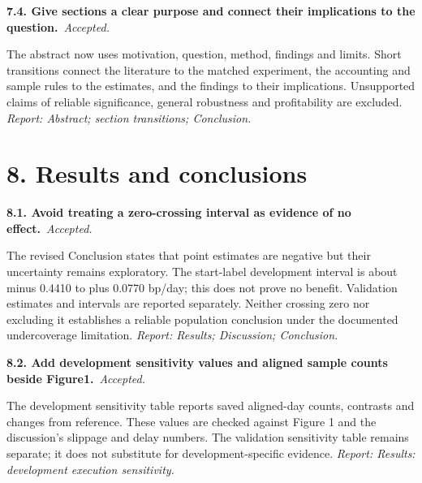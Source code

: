 \documentclass[11pt,a4paper]{article}
\newcommand{\Needspace}[1]{\par\begingroup\ifdim\dimexpr\pagegoal-\pagetotal\relax<#1\relax\newpage\fi\endgroup}
\newcommand{\reply}[3]{\par\addvspace{5pt}\noindent\textbf{#1. #2}\ \textit{#3.}\par\nobreak}
\begin{document}
\par\noindent\begin{minipage}{\linewidth}\justifying
\reply{7.4}{Give sections a clear purpose and connect their implications to the question.}{Accepted}
The abstract now uses motivation, question, method, findings and limits. Short transitions connect the literature to the matched experiment, the accounting and sample rules to the estimates, and the findings to their implications. Unsupported claims of reliable significance, general robustness and profitability are excluded.
{\small\textit{Report: Abstract; section transitions; Conclusion.}}
\end{minipage}\par\addvspace{5pt}

\Needspace{10\baselineskip}
\section*{8. Results and conclusions}
\par\noindent\begin{minipage}{\linewidth}\justifying
\reply{8.1}{Avoid treating a zero-crossing interval as evidence of no effect.}{Accepted}
The revised Conclusion states that point estimates are negative but their uncertainty remains exploratory. The start-label development interval is about minus 0.4410 to plus 0.0770 bp/day; this does not prove no benefit. Validation estimates and intervals are reported separately. Neither crossing zero nor excluding it establishes a reliable population conclusion under the documented undercoverage limitation.
{\small\textit{Report: Results; Discussion; Conclusion.}}
\end{minipage}\par\addvspace{5pt}

\par\noindent\begin{minipage}{\linewidth}\justifying
\reply{8.2}{Add development sensitivity values and aligned sample counts beside Figure1.}{Accepted}
The development sensitivity table reports saved aligned-day counts, contrasts and changes from reference. These values are checked against Figure 1 and the discussion's slippage and delay numbers. The validation sensitivity table remains separate; it does not substitute for development-specific evidence.
{\small\textit{Report: Results: development execution sensitivity.}}
\end{minipage}\par\addvspace{5pt}
\end{document}
